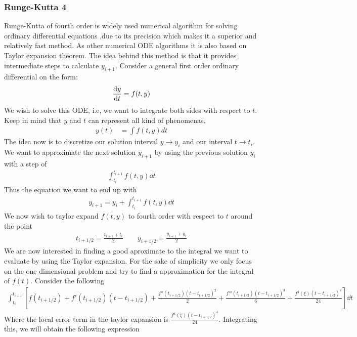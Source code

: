 \documentclass[a4paper, 10pt]{article}
\begin{document}
\subsubsection{Runge-Kutta 4}
Runge-Kutta of fourth order is widely used numerical algorithm for solving ordinary differential equations
,due to its precision which makes it a superior and relatively fast method. As other numerical ODE algorithms it is also based on Taylor expansion theorem.
The idea behind this method is that it provides intermediate steps to calculate
$y_{i+1}$.
Consider a general first order ordinary differential on the form:
\begin{align}
  \dv{y}{t} = f(t,y)
\end{align}
We wish to solve this ODE, i.e, we want to integrate both sides with respect to $t$.
Keep in mind that $y$ and $t$ can represent all kind of phenomenas.
\begin{align}
  y(t) &= \int f(t,y) dt
\end{align}
The idea now is to discretize our solution interval $y \to y_{i}$ and our interval $t \to t_{i}$.
We want to approximate the next solution $y_{i+1}$ by using the previous solution $y_{i}$ with a
step of
\begin{align}
  \int_{t_{i}}^{t_{i+1}}f(t,y)\dd{t}
\end{align}
Thus the equation we want to end up with
\begin{align}
  y_{i+1} = y_{i} + \int_{t_{i}}^{t_{i+1}}f(t,y)\dd{t}
  \label{pleb}
\end{align}
We now wish to taylor expand $f(t,y)$ to fourth order with respect to $t$ around
the point
\begin{align}
  t_{i+1/2} = \frac{t_{i+1}+t_{i}}{2} \qquad   y_{i+1/2} = \frac{y_{i+1}+y_{i}}{2}
\end{align}
We are now interested in finding a good aproximate to the integral we want to evaluate
by using the Taylor expansion. For the sake of simplicity we only focus on the one dimensional
problem and try to find a approximation for the integral of $f(t)$. Consider the following
\begin{align*}
  \int_{t_{i}}^{t_{i+1}}\left[f(t_{i+1/2}) + f'(t_{i+1/2})(t-t_{i+1/2}) +
  \frac{f''(t_{i+1/2})(t-t_{i+1/2})^{2}}{2} + \frac{f'''(t_{i+1/2})(t-t_{i+1/2})^{3}}{6}
  + \frac{f^{4}(\xi)(t-t_{i+1/2})^{4}}{24}
  \right]\dd{t}
\end{align*}
Where the local error term in the taylor expansion is $\frac{f^{4}(\xi)(t-t_{i+1/2})^{4}}{24}$.
Integrating this, we will obtain the following expression
\end{document}
